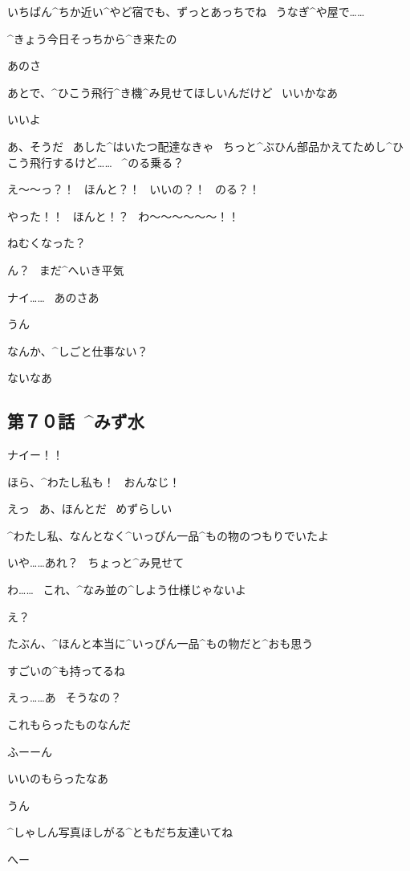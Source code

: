 \NA いちばん^{ちか}{近}い^{やど}{宿}でも、ずっとあっちでね
\ うなぎ^{や}{屋}で……

\A ^{きょう}{今日}そっちから^{き}{来}たの

\page
\A あのさ

\A あとで、^{ひこう}{飛行}^{き}{機}^{み}{見}せてほしいんだけど
\ いいかなあ

\NA いいよ

\NA あ、そうだ
\ あした^{はいたつ}{配達}なきゃ
\ ちっと^{ぶひん}{部品}かえてためし^{ひこう}{飛行}するけど……
\ ^{のる}{乗る}？

\A え〜〜っ？！
\ ほんと？！
\ いいの？！
\ のる？！

\A やった！！
\ ほんと！？
\ わ〜〜〜〜〜〜！！

\page[57]
\NA ねむくなった？

\A ん？
\ まだ^{へいき}{平気}

\A ナイ……
\ あのさあ

\NA うん

\page
\A なんか、^{しごと}{仕事}ない？

\NA ないなあ


\subsection{第７０話\ ^{みず}{水}}

\page[61]
\A ナイー！！

\page
\A ほら、^{わたし}{私}も！
\ おんなじ！

\NA えっ
\ あ、ほんとだ
\ めずらしい

\A ^{わたし}{私}、なんとなく^{いっぴん}{一品}^{もの}{物}のつもりでいたよ

\NA いや……あれ？
\ ちょっと^{み}{見}せて

\NA わ……
\ これ、^{なみ}{並}の^{しよう}{仕様}じゃないよ

\A え？

\NA たぶん、^{ほんと}{本当}に^{いっぴん}{一品}^{もの}{物}だと^{おも}{思}う

\NA すごいの^{も}{持}ってるね

\page
\A えっ……あ
\ そうなの？

\A これもらったものなんだ

\NA ふーーん

\NA いいのもらったなあ

\A うん

\NA ^{しゃしん}{写真}ほしがる^{ともだち}{友達}いてね

\A へー

